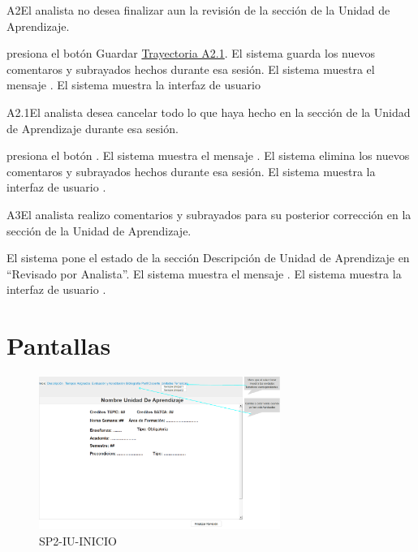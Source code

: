 \label{SP2-CU7-A2}
\begin{UCtrayectoriaA}{A2}{El analista no desea finalizar aun la revisión de la sección de la Unidad de Aprendizaje.}

    \UCpaso[\UCactor] presiona el botón Guardar \hyperref[SP2-CU7-A2.1]{Trayectoria A2.1}. 
    \UCpaso El sistema guarda los nuevos comentaros y subrayados hechos durante esa sesión.
    \UCpaso El sistema muestra el mensaje .
    \UCpaso El sistema muestra la interfaz de usuario 
\end{UCtrayectoriaA}

\label{SP2-CU7-A2.1}
\begin{UCtrayectoriaA}{A2.1}{El analista desea cancelar todo lo que haya hecho en la sección de la Unidad de Aprendizaje durante esa sesión.}

	\UCpaso[\UCactor] presiona el botón . 
    \UCpaso El sistema muestra el mensaje .
    \UCpaso El sistema elimina los nuevos comentaros y subrayados hechos durante esa sesión.
    \UCpaso El sistema muestra la interfaz de usuario .
\end{UCtrayectoriaA}

\label{SP2-CU7-A3}
\begin{UCtrayectoriaA}{A3}{El analista realizo comentarios y subrayados para su posterior corrección en la sección de la Unidad de Aprendizaje.} 

	\UCpaso El sistema pone el estado de la sección Descripción de Unidad de Aprendizaje en “Revisado por Analista”. 
    \UCpaso El sistema muestra el mensaje .
    \UCpaso El sistema muestra la interfaz de usuario .
\end{UCtrayectoriaA}

\chapter{Pantallas}
 \begin{figure}
  \centering
    \includegraphics[width=0.7\textwidth]{DCU/SP2/Pantallas/Inicio}
  \caption{SP2-IU-INICIO}
  \label{SP2-IU-INICIO}
\end{figure}

